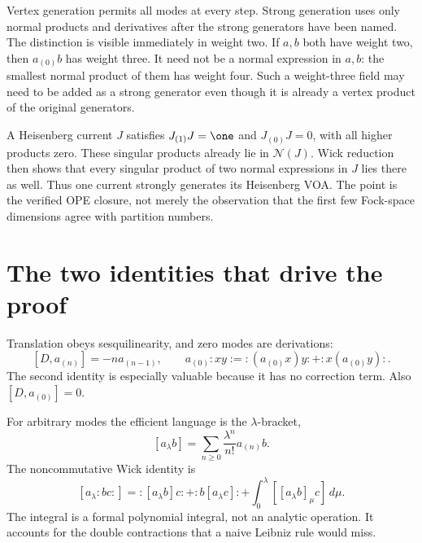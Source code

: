 Vertex generation permits all modes at every step. Strong generation
uses only normal products and derivatives after the strong generators
have been named. The distinction is visible immediately in weight two.
If $a,b$ both have weight two, then $a_{(0)}b$ has weight three.
It need not be a normal expression in $a,b$: the smallest normal
product of them has weight four. Such a weight-three field may need to
be added as a strong generator even though it is already a vertex
product of the original generators.

\begin{example}
A Heisenberg current $J$ satisfies $J_{(1)}J=\one$ and
$J_{(0)}J=0$, with all higher products zero. These singular products
already lie in $\mathcal N(J)$. Wick reduction then shows that every
singular product of two normal expressions in $J$ lies there as well.
Thus one current strongly generates its Heisenberg VOA. The point is
the verified OPE closure, not merely the observation that the first
few Fock-space dimensions agree with partition numbers.
\end{example}

\section{The two identities that drive the proof}

Translation obeys sesquilinearity, and zero modes are derivations:
\[
 [D,a_{(n)}]=-n a_{(n-1)},\qquad
 a_{(0)}:xy:=:(a_{(0)}x)y:+:x(a_{(0)}y):.
\]
The second identity is especially valuable because it has no correction
term. Also $[D,a_{(0)}]=0$.

For arbitrary modes the efficient language is the $\lambda$-bracket,
\[
 [a_\lambda b]=\sum_{n\geq0}\frac{\lambda^n}{n!}a_{(n)}b.
\]
The noncommutative Wick identity is
\begin{equation}\label{eq:c-wick}
 [a_\lambda:bc:]=:[a_\lambda b]c:+:b[a_\lambda c]:
          +\int_0^\lambda[[a_\lambda b]_\mu c]\,d\mu.
\end{equation}
The integral is a formal polynomial integral, not an analytic operation.
It accounts for the double contractions that a naive Leibniz rule
would miss.

